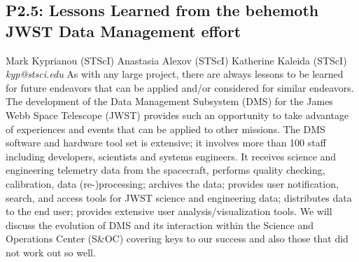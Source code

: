 \documentclass{report}
\begin{document}
\subsection*{P2.5: Lessons Learned from the behemoth JWST Data Management effort}
\bigskip
Mark Kyprianou (STScI) \newline Anastasia Alexov (STScI) \newline  Katherine Kaleida (STScI)\newline   \newline  \newline  \newline\newline
{\it kyp@stsci.edu}\newline
\newline\newline
As with any large project, there are always lessons to be learned for future endeavors that can be applied and/or considered for similar endeavors.  The development of the Data Management Subsystem (DMS) for the James Webb Space Telescope (JWST) provides such an opportunity to take advantage of experiences and events that can be applied to other missions. The DMS software and hardware tool set is extensive; it involves more than 100 staff including developers, scientists and systems engineers.  It receives science and engineering telemetry data from the spacecraft, performs quality checking, calibration, data (re-)processing; archives the data; provides user notification, search, and access tools for JWST science and engineering data;  distributes data to the end user; provides extensive user analysis/visualization tools.  We will discuss the evolution of DMS and its interaction within the Science and Operations Center (S\&OC) covering keys to our success and also those that did not work out so well.\newline
\newpage
\end{document}
